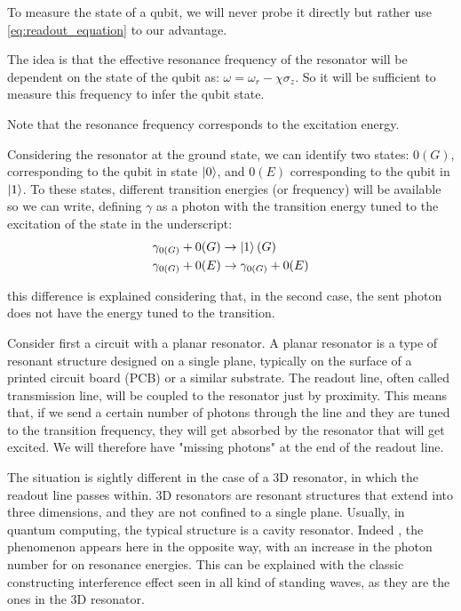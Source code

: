 To measure the state of a qubit, we will never probe it directly but rather use \cref{eq:readout_equation} to our advantage.

The idea is that the effective resonance frequency of the resonator will be dependent on the state of the qubit as: $\omega = \omega_r - \chi \sigma_z$. 
So it will be sufficient to measure this frequency to infer the qubit state.

Note that the resonance frequency corresponds to the excitation energy.

Considering the resonator at the ground state, we can identify two states: $0(G)$, corresponding to the qubit in state $\ket 0$, and $0(E)$ corresponding to the qubit in $\ket 1$. To these states, different transition energies (or frequency) will be available so we can write, defining $\gamma$ as a photon with the transition energy tuned to the excitation of the state in the underscript:
\begin{align*}
    \gamma_{0(G)} &+ 0(G) \rightarrow \ket 1(G) \\
    \gamma_{0(G)} &+ 0(E) \rightarrow \gamma_{0(G)} + 0(E) 
\end{align*}

this difference is explained considering that, in the second case, the sent photon does not have the energy tuned to the transition.

Consider first a circuit with a planar resonator. A planar resonator is a type of resonant structure designed on a single plane, typically on the surface of a printed circuit board (PCB) or a similar substrate.
The readout line, often called transmission line, will be coupled to the resonator just by proximity.
This means that, if we send a certain number of photons through the line and they are tuned to the transition frequency, they will get absorbed by the resonator that will get excited. We will therefore have "missing photons" at the end of the readout line.

The situation is sightly different in the case of a 3D resonator, in which the readout line passes within. 3D resonators are resonant structures that extend into three dimensions, and they are not confined to a single plane. Usually, in quantum computing, the typical structure is a cavity resonator.
Indeed , the phenomenon appears here in the opposite way, with an increase in the photon number for on resonance energies. This can be explained with the classic constructing interference effect seen in all kind of standing waves, as they are the ones in the 3D resonator.

